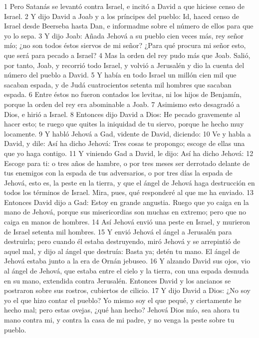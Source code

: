  

1 Pero Satanás se levantó contra Israel, e incitó a David a que hiciese censo de Israel.
2 Y dijo David a Joab y a los príncipes del pueblo: Id, haced censo de Israel desde Beerseba hasta Dan, e informadme sobre el número de ellos para que yo lo sepa.
3 Y dijo Joab: Añada Jehová a su pueblo cien veces más, rey señor mío; ¿no son todos éstos siervos de mi señor? ¿Para qué procura mi señor esto, que será para pecado a Israel?
4 Mas la orden del rey pudo más que Joab. Salió, por tanto, Joab, y recorrió todo Israel, y volvió a Jerusalén y dio la cuenta del número del pueblo a David.
5 Y había en todo Israel un millón cien mil que sacaban espada, y de Judá cuatrocientos setenta mil hombres que sacaban espada.
6 Entre éstos no fueron contados los levitas, ni los hijos de Benjamín, porque la orden del rey era abominable a Joab.
7 Asimismo esto desagradó a Dios, e hirió a Israel.
8 Entonces dijo David a Dios: He pecado gravemente al hacer esto; te ruego que quites la iniquidad de tu siervo, porque he hecho muy locamente.
9 Y habló Jehová a Gad, vidente de David, diciendo:
10 Ve y habla a David, y dile: Así ha dicho Jehová: Tres cosas te propongo; escoge de ellas una que yo haga contigo.
11 Y viniendo Gad a David, le dijo: Así ha dicho Jehová:
12 Escoge para ti: o tres años de hambre, o por tres meses ser derrotado delante de tus enemigos con la espada de tus adversarios, o por tres días la espada de Jehová, esto es, la peste en la tierra, y que el ángel de Jehová haga destrucción en todos los términos de Israel. Mira, pues, qué responderé al que me ha enviado.
13 Entonces David dijo a Gad: Estoy en grande angustia. Ruego que yo caiga en la mano de Jehová, porque sus misericordias son muchas en extremo; pero que no caiga en manos de hombres.
14 Así Jehová envió una peste en Israel, y murieron de Israel setenta mil hombres.
15 Y envió Jehová el ángel a Jerusalén para destruirla; pero cuando él estaba destruyendo, miró Jehová y se arrepintió de aquel mal, y dijo al ángel que destruía: Basta ya; detén tu mano. El ángel de Jehová estaba junto a la era de Ornán jebuseo.
16 Y alzando David sus ojos, vio al ángel de Jehová, que estaba entre el cielo y la tierra, con una espada desnuda en su mano, extendida contra Jerusalén. Entonces David y los ancianos se postraron sobre sus rostros, cubiertos de cilicio.
17 Y dijo David a Dios: ¿No soy yo el que hizo contar el pueblo? Yo mismo soy el que pequé, y ciertamente he hecho mal; pero estas ovejas, ¿qué han hecho? Jehová Dios mío, sea ahora tu mano contra mi, y contra la casa de mi padre, y no venga la peste sobre tu pueblo.
